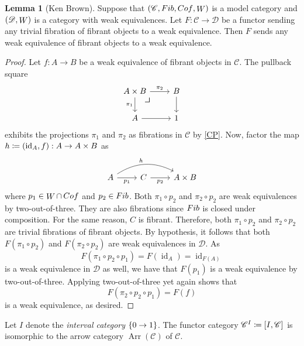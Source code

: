 \documentclass[10pt,letterpaper,cm]{nupset}
\theoremstyle{definition}
\theoremstyle{theorem}
\newtheorem{lemma}[definition]{Lemma}
\theoremstyle{remark}
\newcommand{\0}{\mathbf{0}}
\newcommand{\1}{\mathbf{1}}
\newcommand{\2}{\mathbf{2}}
\DeclareMathOperator{\Ar}{Arr}
\renewcommand{\c}{\mathscr{C}}
\renewcommand{\d}{\mathscr{D}}
\DeclareMathOperator{\idd}{id}
\DeclareMathOperator{\fib}{\mathnormal{Fib}}
\DeclareMathOperator{\cof}{\mathnormal{Cof}}
\DeclareMathOperator{\we}{\mathnormal{W}}
\begin{document}
\begin{lemma}[Ken Brown]\label{KB}
Suppose that $\mleft(\c, \fib, \cof, \we\mright)$ is a model category and $\mleft(\d, \we\mright)$ is a category with weak equivalences. Let $F: \c \to \d$ be a functor sending any trivial fibration  of fibrant objects to a weak equivalence. Then $F$ sends any weak equivalence of fibrant objects to a weak equivalence. 
\end{lemma}
\begin{proof}
Let $f : A \to B$ be a weak equivalence of fibrant objects in $\c$. The pullback square
\[
\begin{tikzcd}
A\times B \arrow[d, "\pi_1"'] \arrow[r, "\pi_2"] 
\arrow[dr, phantom, "\scalebox{1.5}{\color{black}$\lrcorner$}" , very near start, color=black]& B \arrow[d] \\
A \arrow[r]                                      & 1          
\end{tikzcd}
\] exhibits the projections $\pi_1$ and $\pi_2$ as fibrations in $\c$ by \cref{CP}. Now, factor the  map $h\coloneqq \mleft(\idd_A, f\mright) : A \to A \times B$ as
\[
\begin{tikzcd}
A \arrow[r, "p_1"'] \arrow[rr, "h", bend left] & C \arrow[r, "p_2"'] & {A\times B}
\end{tikzcd}
\] where $p_1 \in \we \cap \cof$ and $p_2\in \fib$. Both $\pi_1 \circ p_2$ and $\pi_2 \circ p_2$ are weak equivalences by two-out-of-three. They are also fibrations since $\fib$ is closed under composition. For the same reason, $C$ is fibrant. Therefore, both $\pi_1 \circ p_2$ and $\pi_2 \circ p_2$ are trivial fibrations of fibrant objects. By hypothesis, it follows that both $F(\pi_1 \circ p_2)$ and $F(\pi_2 \circ p_2)$ are weak equivalences in $\d$. As $$F(\pi_1 \circ p_2 \circ p_1) = F(\idd_A) = \idd_{F(A)}$$ is  a weak equivalence in $\d$ as well, we have that $F(p_1)$ is a weak equivalence by two-out-of-three. Applying two-out-of-three yet again shows that $$F(\pi_2 \circ p_2\circ p_1) =F(f)$$ is a weak equivalence, as desired.  
\end{proof}

\smallskip

Let  $I$ denote the \textit{interval category} $\mleft\{0 \to 1\mright\}$. The functor category $\c^I \coloneqq \mleft[I, \c\mright]$ is isomorphic to the arrow category $\Ar(\c)$ of $\c$.
\end{document}
